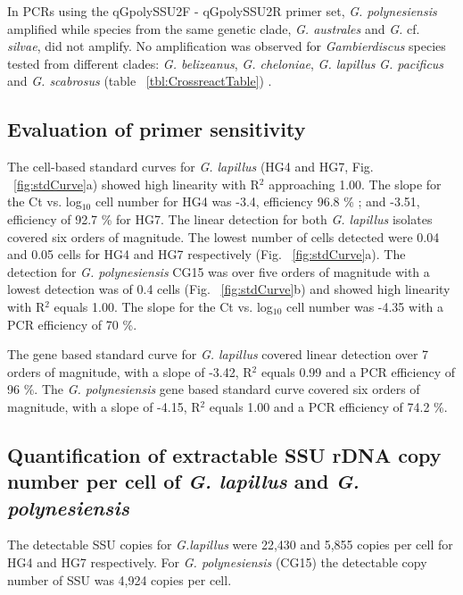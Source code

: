 \documentclass[12pt]{article}
\begin{document}
In PCRs using the qGpolySSU2F - qGpolySSU2R primer set, \emph{G. polynesiensis} amplified while species from the same genetic clade, \emph{G. australes} and \emph{G.} cf. \emph{silvae}, did not amplify. No amplification was observed for \emph{Gambierdiscus} species tested from different clades: \emph{G. belizeanus}, \emph{G. cheloniae}, \emph{G. lapillus }\emph{G. pacificus} and \emph{G. scabrosus} (table ~\ref{tbl:CrossreactTable}) \citep{kretzschmar2016characterization}.


 
\subsection*{Evaluation of primer sensitivity}
The cell-based standard curves for \emph{G. lapillus} (HG4 and HG7, Fig. ~\ref{fig:stdCurve}a) showed high linearity with R$^{2}$ approaching 1.00. The slope for the Ct vs. log$_{10}$ cell number for HG4  was -3.4, efficiency 96.8 \%%
; and -3.51, efficiency of 92.7 \% %
for HG7. The linear detection for both \emph{G. lapillus} isolates covered six orders of magnitude. The lowest number of cells detected were 0.04 and 0.05 cells for HG4 and HG7 respectively (Fig. ~\ref{fig:stdCurve}a).
The detection for \emph{G. polynesiensis} CG15 was over five orders of magnitude with a lowest detection was of 0.4 cells (Fig. ~\ref{fig:stdCurve}b) and showed high linearity with R$^{2}$ equals 1.00. The slope for the Ct vs. log$_{10}$ cell number was -4.35 with a PCR efficiency of 70 \%.



The gene based standard curve for \emph{G. lapillus} covered linear detection over 7 orders of magnitude, with a slope of -3.42, R$^{2}$ equals 0.99 and a PCR efficiency of 96 \%. %
The \emph{G. polynesiensis} gene based standard curve covered six orders of magnitude, with a slope of -4.15, R$^{2}$ equals 1.00 and a PCR efficiency of 74.2 \%.



\subsection*{Quantification of extractable SSU rDNA copy number per cell of \emph{G. lapillus} and \emph{G. polynesiensis}}
The detectable SSU copies for \emph{G.lapillus} were 22,430 and 5,855 copies per cell for HG4 and HG7 respectively. For \emph{G. polynesiensis} (CG15) the detectable copy number of SSU was 4,924 copies per cell.
\end{document}
